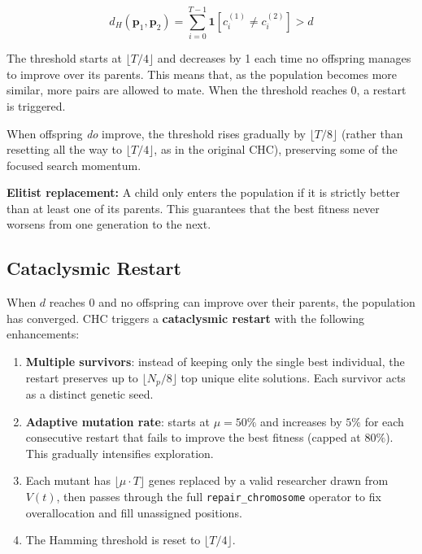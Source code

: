 \documentclass[12pt, a4paper]{article}
\begin{document}
\begin{equation}
  d_H(\mathbf{p}_1, \mathbf{p}_2) = \sum_{i=0}^{T-1} \mathbf{1}[c_i^{(1)} \neq c_i^{(2)}] > d
\end{equation}

The threshold starts at $\lfloor T/4 \rfloor$ and decreases by 1 each time no
offspring manages to improve over its parents. This means that, as the population
becomes more similar, more pairs are allowed to mate. When the threshold reaches 0,
a restart is triggered.

When offspring \emph{do} improve, the threshold rises gradually by
$\lfloor T/8 \rfloor$ (rather than resetting all the way to $\lfloor T/4 \rfloor$,
as in the original CHC), preserving some of the focused search momentum.

\textbf{Elitist replacement:} A child only enters the population if it is strictly
better than at least one of its parents. This guarantees that the best fitness
never worsens from one generation to the next.

\subsection{Cataclysmic Restart}
\label{sec:restart}

When $d$ reaches $0$ and no offspring can improve over their parents, the
population has converged. CHC triggers a \textbf{cataclysmic restart} with
the following enhancements:

\begin{enumerate}[itemsep=0.1em]
  \item \textbf{Multiple survivors}: instead of keeping only the single best
        individual, the restart preserves up to $\lfloor N_p/8 \rfloor$ top
        unique elite solutions. Each survivor acts as a distinct genetic seed.
  \item \textbf{Adaptive mutation rate}: starts at $\mu = 50\%$ and increases
        by $5\%$ for each consecutive restart that fails to improve the best
        fitness (capped at $80\%$). This gradually intensifies exploration.
  \item Each mutant has $\lfloor \mu \cdot T \rfloor$ genes replaced by a
        valid researcher drawn from $V(t)$, then passes through the full
        \texttt{repair\_chromosome} operator to fix overallocation and fill
        unassigned positions.
  \item The Hamming threshold is reset to $\lfloor T/4 \rfloor$.
\end{enumerate}
\end{document}
